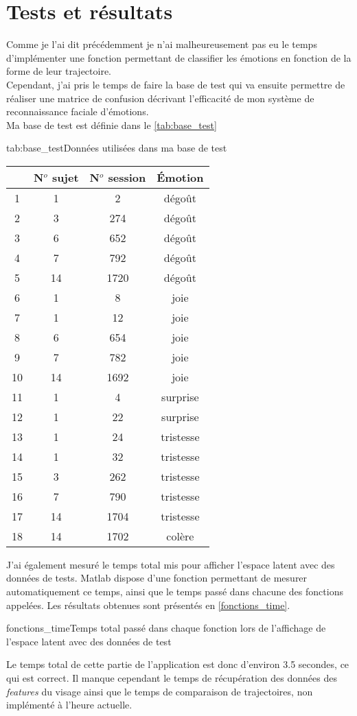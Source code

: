 \documentclass[poster]{polytech/polytech}
\begin{document}
\chapter{Tests et résultats}
Comme je l'ai dit précédemment je n'ai malheureusement pas eu le temps d'implémenter une fonction permettant de classifier les émotions en fonction de la forme de leur trajectoire.\\
Cependant, j'ai pris le temps de faire la base de test qui va ensuite permettre de réaliser une matrice de confusion décrivant l'efficacité de mon système de reconnaissance faciale d'émotions.\\
Ma base de test est définie dans le \autoref{tab:base_test}
\begin{Table}{tab:base_test}{Données utilisées dans ma base de test}
	\begin{tabular}{|c|c|c|c|}
		\hline
		  &\textbf{N$^{o}$ sujet} &\textbf{N$^{o}$ session}&\textbf{Émotion} \\\hline
		1& 1 & 2& dégoût\\\hline
		2& 3 & 274& dégoût\\\hline
		3& 6 & 652& dégoût\\\hline
		4& 7 & 792& dégoût\\\hline
		5& 14 & 1720& dégoût\\\hline
		6& 1 & 8& joie\\\hline
		7& 1 & 12& joie\\\hline
		8& 6 & 654& joie\\\hline
		9& 7 & 782& joie\\\hline
		10& 14 & 1692& joie\\\hline
		11& 1 & 4& surprise\\\hline
		12& 1 & 22& surprise\\\hline
		13& 1 & 24& tristesse\\\hline
		14& 1 & 32& tristesse\\\hline
		15& 3 & 262& tristesse\\\hline
		16& 7 & 790& tristesse\\\hline
		17& 14 & 1704& tristesse\\\hline
		18& 14 & 1702& colère\\\hline
	\end{tabular}
\end{Table}

J'ai également mesuré le temps total mis pour afficher l'espace latent avec des données de tests. Matlab dispose d'une fonction permettant de mesurer automatiquement ce temps, ainsi que le temps passé dans chacune des fonctions appelées. Les résultats obtenues sont présentés en \autoref{fonctions_time}.\\
\begin{Figure}{fonctions_time}{Temps total passé dans chaque fonction lors de l'affichage de l'espace latent avec des données de test}
\end{Figure}
Le temps total de cette partie de l'application est donc d'environ 3.5 secondes, ce qui est correct. Il manque cependant le temps de récupération des données des \textit{features} du visage ainsi que le temps de comparaison de trajectoires, non implémenté à l'heure actuelle.
\end{document}
